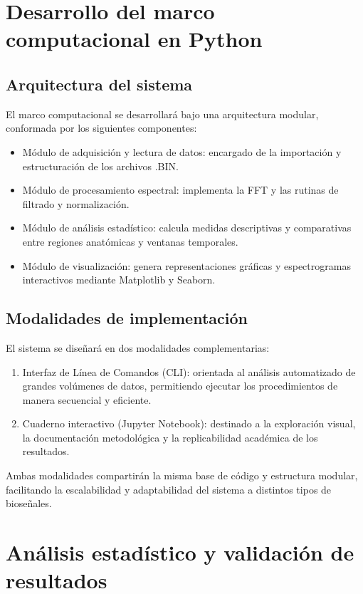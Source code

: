 \section{Desarrollo del marco computacional en Python}

\subsection{Arquitectura del sistema}

El marco computacional se desarrollará bajo una arquitectura modular, conformada por los siguientes componentes:

\begin{itemize}
	\item Módulo de adquisición y lectura de datos: encargado de la importación y estructuración de los archivos .BIN.
	\item Módulo de procesamiento espectral: implementa la FFT y las rutinas de filtrado y normalización.
	\item Módulo de análisis estadístico: calcula medidas descriptivas y comparativas entre regiones anatómicas y ventanas temporales.
	\item Módulo de visualización: genera representaciones gráficas y espectrogramas interactivos mediante Matplotlib y Seaborn.
\end{itemize}

\subsection{Modalidades de implementación}

El sistema se diseñará en dos modalidades complementarias:

\begin{enumerate}
	\item Interfaz de Línea de Comandos (CLI): orientada al análisis automatizado de grandes volúmenes de datos, permitiendo ejecutar los procedimientos de manera secuencial y eficiente.
	\item Cuaderno interactivo (Jupyter Notebook): destinado a la exploración visual, la documentación metodológica y la replicabilidad académica de los resultados.
\end{enumerate}

Ambas modalidades compartirán la misma base de código y estructura modular, facilitando la escalabilidad y adaptabilidad del sistema a distintos tipos de bioseñales.

\section{Análisis estadístico y validación de resultados}


